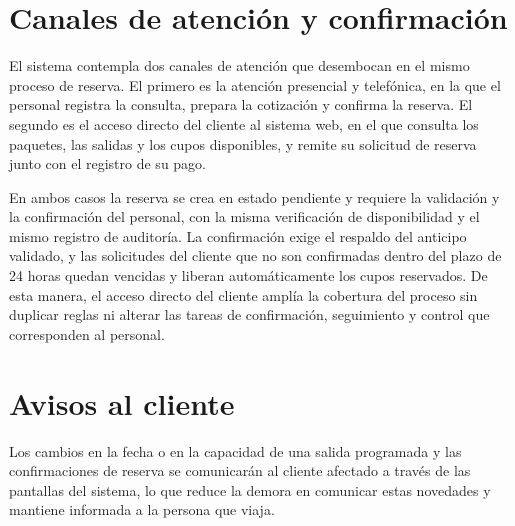 \section*{Canales de atención y confirmación}

El sistema contempla dos canales de atención que desembocan en el mismo
proceso de reserva. El primero es la atención presencial y telefónica, en la
que el personal registra la consulta, prepara la cotización y confirma la
reserva. El segundo es el acceso directo del cliente al sistema web, en el que
consulta los paquetes, las salidas y los cupos disponibles, y remite su
solicitud de reserva junto con el registro de su pago.

En ambos casos la reserva se crea en estado pendiente y requiere la validación
y la confirmación del personal, con la misma verificación de disponibilidad y
el mismo registro de auditoría. La confirmación exige el respaldo del anticipo
validado, y las solicitudes del cliente que no son confirmadas dentro del
plazo de 24 horas quedan vencidas y liberan automáticamente los cupos
reservados. De esta manera, el acceso directo del
cliente amplía la cobertura del proceso sin duplicar reglas ni alterar las
tareas de confirmación, seguimiento y control que corresponden al personal.

\section*{Avisos al cliente}

Los cambios en la fecha o en la capacidad de una salida programada y las
confirmaciones de reserva se comunicarán al cliente afectado a través de las
pantallas del sistema, lo que reduce la demora en comunicar estas novedades y
mantiene informada a la persona que viaja.
